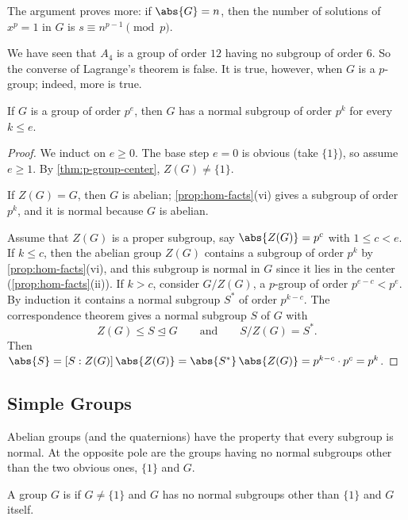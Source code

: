 \begin{remark}
	The argument proves more: if \(\abs{G} = n\), then the number of solutions of
	\(x^p = 1\) in \(G\) is \(s \equiv n^{p-1} \pmod p\).
\end{remark}

We have seen that \(A_4\) is a group of order \(12\) having no subgroup of order \(6\). So
the converse of Lagrange's theorem is false. It is true, however, when \(G\) is a
\(p\)-group; indeed, more is true.

\begin{proposition}\label{prop:p-group-normal-subgroups}
	If \(G\) is a group of order \(p^e\), then \(G\) has a normal subgroup of order \(p^k\)
	for every \(k \leq e\).
\end{proposition}

\begin{proof}
	We induct on \(e \geq 0\). The base step \(e = 0\) is obvious (take \(\{1\}\)), so
	assume \(e \geq 1\). By \autoref{thm:p-group-center}, \(Z(G) \neq \{1\}\).

	If \(Z(G) = G\), then \(G\) is abelian; \autoref{prop:hom-facts}(vi) gives a subgroup
	of order \(p^k\), and it is normal because \(G\) is abelian.

	Assume that \(Z(G)\) is a proper subgroup, say \(\abs{Z(G)} = p^c\) with
	\(1 \leq c < e\). If \(k \leq c\), then the abelian group \(Z(G)\) contains a subgroup
	of order \(p^k\) by \autoref{prop:hom-facts}(vi), and this subgroup is normal in \(G\)
	since it lies in the center (\autoref{prop:hom-facts}(ii)). If \(k > c\), consider
	\(G/Z(G)\), a \(p\)-group of order \(p^{e-c} < p^e\). By induction it contains a
	normal subgroup \(S^*\) of order \(p^{k-c}\). The correspondence theorem gives a
	normal subgroup \(S\) of \(G\) with
	\[
		Z(G) \leq S \trianglelefteq G \qquad\text{and}\qquad S/Z(G) = S^*.
	\]
	Then \(\abs{S} = [S : Z(G)]\,\abs{Z(G)} = \abs{S^*}\,\abs{Z(G)}
	= p^{k-c}\cdot p^c = p^k\).
\end{proof}

\subsection{Simple Groups}

Abelian groups (and the quaternions) have the property that every subgroup is normal. At
the opposite pole are the groups having no normal subgroups other than the two obvious
ones, \(\{1\}\) and \(G\).

\begin{definition}
	A group \(G\) is  if \(G \neq \{1\}\) and \(G\) has no normal subgroups
	other than \(\{1\}\) and \(G\) itself.
\end{definition}

